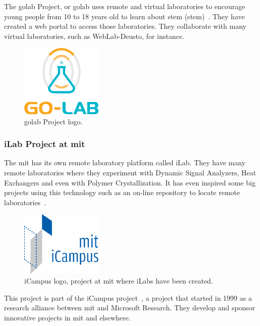 The \acrshort{golab} Project, or \acrlong{golab} uses remote and virtual laboratories to encourage
young people from 10 to 18 years old to learn about \acrlong{stem}
(\acrshort{stem})~\cite{golab_web}. They have created a web portal to access those laboratories.
They collaborate with many virtual laboratories, such as WebLab-Deusto, for instance.

\begin{figure}[!htbp]
	\centering
	\includegraphics[width=0.35\textwidth]{fig/golab}
	\caption{\acrshort{golab} Project logo.}
\end{figure}

\subsubsection{iLab Project at \acrshort{mit}}

The \acrlong{mit} has its own remote laboratory platform called iLab. They have many remote
laboratories where they experiment with Dynamic Signal Analyzers, Heat Exchangers and even with
Polymer Crystallization. It has even inspired some big projects using this technology such as an
on-line repository to locate remote laboratories~\cite{ilabs_multi}.

\begin{figure}[!htbp]
	\centering
	\includegraphics[width=0.35\textwidth]{fig/icampus.eps}
	\caption{iCampus logo, project at \acrshort{mit} where iLabs have been created.}
\end{figure}

This project is part of the iCampus project~\cite{icampus_web}, a project that started in 1999 as a
research alliance between \acrshort{mit} and Microsoft Research. They develop and sponsor innovative
projects in \acrshort{mit} and elsewhere.

